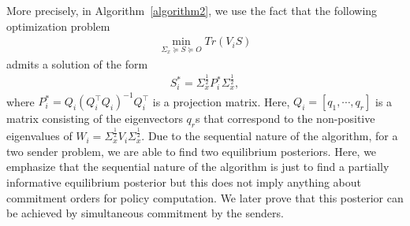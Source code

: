 \documentclass[12pt,journal,onecolumn]{IEEEtran}
\begin{document}
More precisely, in Algorithm~\ref{algorithm2}, we use the fact that the following optimization problem %
\begin{align} \label{eqn:tamura}
    \min_{\Sigma_x\succeq S\succeq O} Tr(V_i S)
\end{align}
admits a solution of the form %
\begin{align}\label{eqn:soln_tamura}
    S_i^* =\Sigma_x^{\frac{1}{2}}P_i^*\Sigma_x^{\frac{1}{2}}, 
\end{align}
where $P_i^* = Q_i(Q_i^\top Q_i)^{-1}Q_i^\top$ is a projection matrix. Here, $ Q_i = [q_1,\cdots,q_r]$ is a matrix consisting of the eigenvectors $q_r$s that correspond to the non-positive eigenvalues of $W_i = \Sigma_x^{\frac{1}{2}}V_{i}\Sigma_x^{\frac{1}{2}}$.  Due to the sequential nature of the algorithm, for a two sender problem, we are able to find two equilibrium posteriors. Here, we emphasize that the sequential nature of the algorithm is just to find a partially informative equilibrium posterior but this does not imply anything about commitment orders for policy computation. We later prove that this posterior can be achieved by simultaneous commitment by the senders.
\end{document}
